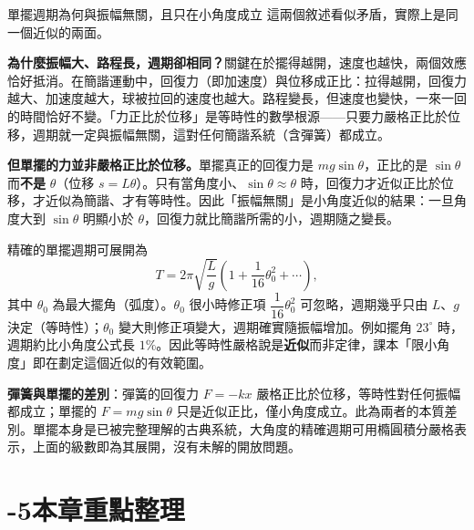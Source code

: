 \documentclass[11pt]{article}
\begin{document}
\begin{延伸框}{單擺週期為何與振幅無關，且只在小角度成立}
這兩個敘述看似矛盾，實際上是同一個近似的兩面。

\textbf{為什麼振幅大、路程長，週期卻相同？}關鍵在於擺得越開，速度也越快，兩個效應恰好抵消。在簡諧運動中，回復力（即加速度）與位移成正比：拉得越開，回復力越大、加速度越大，球被拉回的速度也越大。路程變長，但速度也變快，一來一回的時間恰好不變。「力正比於位移」是等時性的數學根源——只要力嚴格正比於位移，週期就一定與振幅無關，這對任何簡諧系統（含彈簧）都成立。

\textbf{但單擺的力並非嚴格正比於位移。}單擺真正的回復力是 $mg\sin\theta$，正比的是 $\sin\theta$ 而\textbf{不是} $\theta$（位移 $s=L\theta$）。只有當角度小、$\sin\theta\approx\theta$ 時，回復力才近似正比於位移，才近似為簡諧、才有等時性。因此「振幅無關」是小角度近似的結果：一旦角度大到 $\sin\theta$ 明顯小於 $\theta$，回復力就比簡諧所需的小，週期隨之變長。

精確的單擺週期可展開為
$$T=2\pi\sqrt{\frac{L}{g}}\left(1+\frac{1}{16}\theta_0^2+\cdots\right),$$
其中 $\theta_0$ 為最大擺角（弧度）。$\theta_0$ 很小時修正項 $\dfrac{1}{16}\theta_0^2$ 可忽略，週期幾乎只由 $L$、$g$ 決定（等時性）；$\theta_0$ 變大則修正項變大，週期確實隨振幅增加。例如擺角 $23^\circ$ 時，週期約比小角度公式長 $1\%$。因此等時性嚴格說是\textbf{近似}而非定律，課本「限小角度」即在劃定這個近似的有效範圍。

\textbf{彈簧與單擺的差別}：彈簧的回復力 $F=-kx$ 嚴格正比於位移，等時性對任何振幅都成立；單擺的 $F=mg\sin\theta$ 只是近似正比，僅小角度成立。此為兩者的本質差別。單擺本身是已被完整理解的古典系統，大角度的精確週期可用橢圓積分嚴格表示，上面的級數即為其展開，沒有未解的開放問題。
\end{延伸框}

\section*{-5\quad 本章重點整理}
\end{document}
